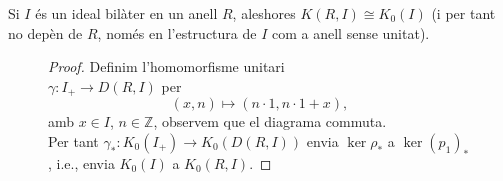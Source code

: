 \begin{theorem}[Escisió]
Si $I$ és un ideal bilàter en un anell $R$, aleshores $K(R,I)\cong K_0(I)$ (i per tant no depèn de $R$, només en l'estructura de $I$ com a anell sense unitat).
\end{theorem}



 
 
 
 \begin{figure}[!htb]
    \centering
    \begin{minipage}{.66\textwidth}
\begin{proof}\renewcommand{\qedsymbol}{}         
         Definim l'homomorfisme unitari \\$\gamma: I_+ \rightarrow D(R,I)$ per
 $$
 (x,n) \mapsto (n \cdot 1, n\cdot 1 + x),$$ amb   $x\in I$,  $n \in \mathbb{Z}$, observem que el diagrama commuta. \\Per tant $\gamma_*: K_0(I_+) \rightarrow K_0(D(R,I))$ envia $\ker \rho_*$ a $\ker (p_1)_*$, i.e., envia $K_0(I)$ a $K_0(R,I)$.
 \end{proof}
    \end{minipage}%
    \begin{minipage}{0.33\textwidth}
    \end{minipage}
\end{figure}
